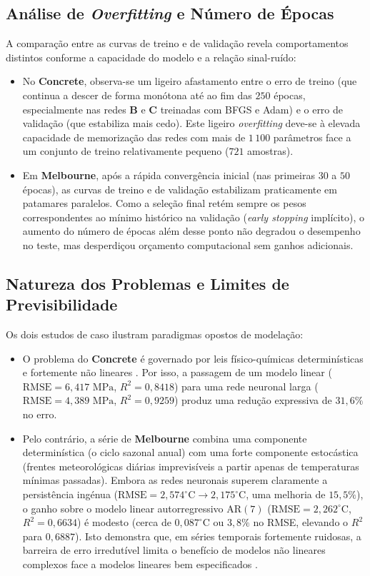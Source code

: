 \documentclass[conference]{IEEEtran}
\begin{document}
\subsection{Análise de \textit{Overfitting} e Número de Épocas}
A comparação entre as curvas de treino e de validação revela comportamentos distintos conforme a capacidade do modelo e a relação sinal-ruído:
\begin{itemize}
    \item No \textbf{Concrete}, observa-se um ligeiro afastamento entre o erro de treino (que continua a descer de forma monótona até ao fim das $250$ épocas, especialmente nas redes \textbf{B} e \textbf{C} treinadas com BFGS e Adam) e o erro de validação (que estabiliza mais cedo). Este ligeiro \textit{overfitting} deve-se à elevada capacidade de memorização das redes com mais de $1\,100$ parâmetros face a um conjunto de treino relativamente pequeno ($721$ amostras).
    \item Em \textbf{Melbourne}, após a rápida convergência inicial (nas primeiras $30$ a $50$ épocas), as curvas de treino e de validação estabilizam praticamente em patamares paralelos. Como a seleção final retém sempre os pesos correspondentes ao mínimo histórico na validação (\textit{early stopping} implícito), o aumento do número de épocas além desse ponto não degradou o desempenho no teste, mas desperdiçou orçamento computacional sem ganhos adicionais.
\end{itemize}

\subsection{Natureza dos Problemas e Limites de Previsibilidade}
Os dois estudos de caso ilustram paradigmas opostos de modelação:
\begin{itemize}
    \item O problema do \textbf{Concrete} é governado por leis físico-químicas determinísticas e fortemente não lineares \cite{b3, b11}. Por isso, a passagem de um modelo linear ($\text{RMSE} = 6{,}417\text{ MPa}$, $R^2 = 0{,}8418$) para uma rede neuronal larga ($\text{RMSE} = 4{,}389\text{ MPa}$, $R^2 = 0{,}9259$) produz uma redução expressiva de $31{,}6\%$ no erro.
    \item Pelo contrário, a série de \textbf{Melbourne} combina uma componente determinística (o ciclo sazonal anual) com uma forte componente estocástica (frentes meteorológicas diárias imprevisíveis a partir apenas de temperaturas mínimas passadas). Embora as redes neuronais superem claramente a persistência ingénua ($\text{RMSE} = 2{,}574^{\circ}\text{C} \to 2{,}175^{\circ}\text{C}$, uma melhoria de $15{,}5\%$), o ganho sobre o modelo linear autorregressivo $\text{AR}(7)$ ($\text{RMSE} = 2{,}262^{\circ}\text{C}$, $R^2 = 0{,}6634$) é modesto (cerca de $0{,}087^{\circ}\text{C}$ ou $3{,}8\%$ no RMSE, elevando o $R^2$ para $0{,}6887$). Isto demonstra que, em séries temporais fortemente ruidosas, a barreira de erro irredutível limita o benefício de modelos não lineares complexos face a modelos lineares bem especificados \cite{b10}.
\end{itemize}
\end{document}

